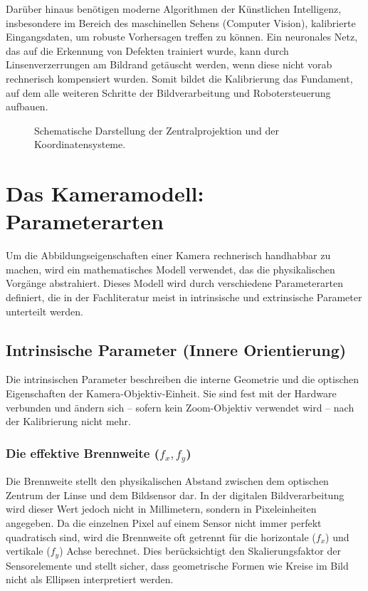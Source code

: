 \documentclass[12pt,a4paper,parskip=half]{scrartcl}
\begin{document}
Darüber hinaus benötigen moderne Algorithmen der Künstlichen Intelligenz, insbesondere im Bereich des maschinellen Sehens (Computer Vision), kalibrierte Eingangsdaten, um robuste Vorhersagen treffen zu können. Ein neuronales Netz, das auf die Erkennung von Defekten trainiert wurde, kann durch Linsenverzerrungen am Bildrand getäuscht werden, wenn diese nicht vorab rechnerisch kompensiert wurden. Somit bildet die Kalibrierung das Fundament, auf dem alle weiteren Schritte der Bildverarbeitung und Robotersteuerung aufbauen.

\begin{figure}[h!]
    \centering
    \caption{Schematische Darstellung der Zentralprojektion und der Koordinatensysteme.}
    \label{fig:projection_model}
\end{figure}

\section{Das Kameramodell: Parameterarten}
Um die Abbildungseigenschaften einer Kamera rechnerisch handhabbar zu machen, wird ein mathematisches Modell verwendet, das die physikalischen Vorgänge abstrahiert. Dieses Modell wird durch verschiedene Parameterarten definiert, die in der Fachliteratur meist in intrinsische und extrinsische Parameter unterteilt werden.

\subsection{Intrinsische Parameter (Innere Orientierung)}
Die intrinsischen Parameter beschreiben die interne Geometrie und die optischen Eigenschaften der Kamera-Objektiv-Einheit. Sie sind fest mit der Hardware verbunden und ändern sich – sofern kein Zoom-Objektiv verwendet wird – nach der Kalibrierung nicht mehr.

\subsubsection{Die effektive Brennweite (\texorpdfstring{$f_x, f_y$}{fx, fy})}
Die Brennweite stellt den physikalischen Abstand zwischen dem optischen Zentrum der Linse und dem Bildsensor dar. In der digitalen Bildverarbeitung wird dieser Wert jedoch nicht in Millimetern, sondern in Pixeleinheiten angegeben. Da die einzelnen Pixel auf einem Sensor nicht immer perfekt quadratisch sind, wird die Brennweite oft getrennt für die horizontale ($f_x$) und vertikale ($f_y$) Achse berechnet. Dies berücksichtigt den Skalierungsfaktor der Sensorelemente und stellt sicher, dass geometrische Formen wie Kreise im Bild nicht als Ellipsen interpretiert werden.
\end{document}
